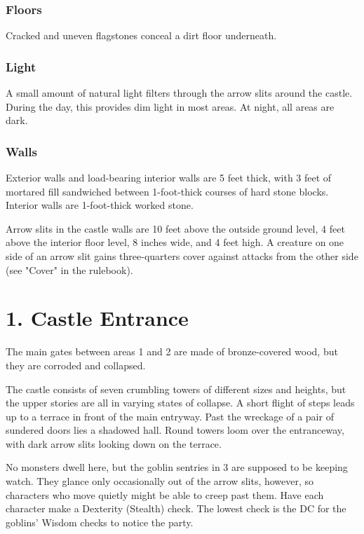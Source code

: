 \documentclass[10pt,a4paper,twoside,bg=print,twocolumn,openany,nodeprecatedcode]{dndbook}
\begin{document}
\subsubsection{Floors}
Cracked and uneven flagstones conceal a dirt floor underneath.

\subsubsection{Light}
A small amount of natural light filters through the arrow slits around the castle. During the day, this provides dim light in most areas. At night, all areas are dark.

\subsubsection{Walls}
Exterior walls and load-bearing interior walls are 5 feet thick, with 3 feet of mortared fill sandwiched between 1-foot-thick courses of hard stone blocks. Interior walls are 1-foot-thick worked stone.

Arrow slits in the castle walls are 10 feet above the outside ground level, 4 feet above the interior floor level, 8 inches wide, and 4 feet high. A creature on one side of an arrow slit gains three-quarters cover against attacks from the other side (see "Cover" in the rulebook).

\section{1. Castle Entrance}
The main gates between areas 1 and 2 are made of bronze-covered wood, but they are corroded and collapsed.

\begin{DndReadAloud}{}
The castle consists of seven crumbling towers of different sizes and heights, but the upper stories are all in varying states of collapse. A short flight of steps leads up to a terrace in front of the main entryway. Past the wreckage of a pair of sundered doors lies a shadowed hall. Round towers loom over the entranceway, with dark arrow slits looking down on the terrace.

\end{DndReadAloud}

No monsters dwell here, but the goblin sentries in 3 are supposed to be keeping watch. They glance only occasionally out of the arrow slits, however, so characters who move quietly might be able to creep past them. Have each character make a Dexterity (Stealth) check. The lowest check is the DC for the goblins' Wisdom checks to notice the party.
\end{document}
